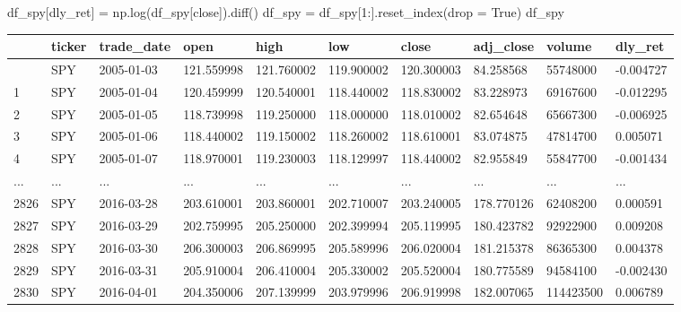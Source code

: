 \documentclass[
  letterpaper,
  DIV=11,
  numbers=noendperiod]{scrreprt}
\newenvironment{Shaded}{\begin{snugshade}}{\end{snugshade}}
\newcommand{\DecValTok}[1]{\textcolor[rgb]{0.68,0.00,0.00}{#1}}
\newcommand{\NormalTok}[1]{\textcolor[rgb]{0.00,0.23,0.31}{#1}}
\newcommand{\OperatorTok}[1]{\textcolor[rgb]{0.37,0.37,0.37}{#1}}
\newcommand{\StringTok}[1]{\textcolor[rgb]{0.13,0.47,0.30}{#1}}
\newcommand{\VariableTok}[1]{\textcolor[rgb]{0.07,0.07,0.07}{#1}}
\begin{document}
\begin{Shaded}
\begin{Highlighting}[]
\NormalTok{df\_spy[}\StringTok{\textquotesingle{}dly\_ret\textquotesingle{}}\NormalTok{] }\OperatorTok{=}\NormalTok{ np.log(df\_spy[}\StringTok{\textquotesingle{}close\textquotesingle{}}\NormalTok{]).diff()}
\NormalTok{df\_spy }\OperatorTok{=}\NormalTok{ df\_spy[}\DecValTok{1}\NormalTok{:].reset\_index(drop }\OperatorTok{=} \VariableTok{True}\NormalTok{)}
\NormalTok{df\_spy}
\end{Highlighting}
\end{Shaded}

\begin{longtable}[]{@{}llllllllll@{}}
\toprule\noalign{}
& ticker & trade\_date & open & high & low & close & adj\_close & volume
& dly\_ret \\
\midrule\noalign{}
\endhead
\bottomrule\noalign{}
\endlastfoot
0 & SPY & 2005-01-03 & 121.559998 & 121.760002 & 119.900002 & 120.300003
& 84.258568 & 55748000 & -0.004727 \\
1 & SPY & 2005-01-04 & 120.459999 & 120.540001 & 118.440002 & 118.830002
& 83.228973 & 69167600 & -0.012295 \\
2 & SPY & 2005-01-05 & 118.739998 & 119.250000 & 118.000000 & 118.010002
& 82.654648 & 65667300 & -0.006925 \\
3 & SPY & 2005-01-06 & 118.440002 & 119.150002 & 118.260002 & 118.610001
& 83.074875 & 47814700 & 0.005071 \\
4 & SPY & 2005-01-07 & 118.970001 & 119.230003 & 118.129997 & 118.440002
& 82.955849 & 55847700 & -0.001434 \\
... & ... & ... & ... & ... & ... & ... & ... & ... & ... \\
2826 & SPY & 2016-03-28 & 203.610001 & 203.860001 & 202.710007 &
203.240005 & 178.770126 & 62408200 & 0.000591 \\
2827 & SPY & 2016-03-29 & 202.759995 & 205.250000 & 202.399994 &
205.119995 & 180.423782 & 92922900 & 0.009208 \\
2828 & SPY & 2016-03-30 & 206.300003 & 206.869995 & 205.589996 &
206.020004 & 181.215378 & 86365300 & 0.004378 \\
2829 & SPY & 2016-03-31 & 205.910004 & 206.410004 & 205.330002 &
205.520004 & 180.775589 & 94584100 & -0.002430 \\
2830 & SPY & 2016-04-01 & 204.350006 & 207.139999 & 203.979996 &
206.919998 & 182.007065 & 114423500 & 0.006789 \\
\end{longtable}
\end{document}
